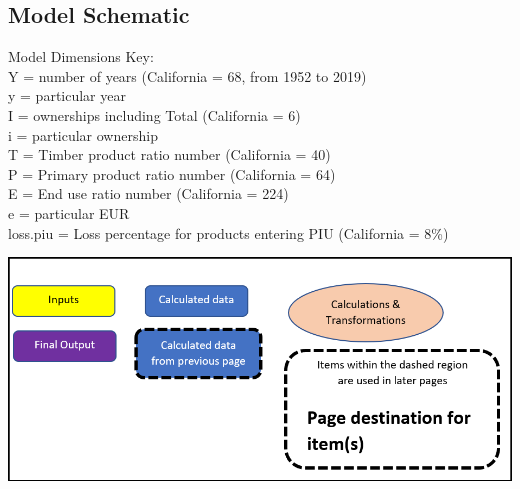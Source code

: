 \documentclass[
  openany]{book}
\begin{document}
\newpage

\hypertarget{model-func-schem}{%
\subsection{Model Schematic}\label{model-func-schem}}

Model Dimensions Key:\\
Y = number of years (California = 68, from 1952 to 2019)\\
y = particular year\\
I = ownerships including Total (California = 6)\\
i = particular ownership\\
T = Timber product ratio number (California = 40)\\
P = Primary product ratio number (California = 64)\\
E = End use ratio number (California = 224)\\
e = particular EUR\\
loss.piu = Loss percentage for products entering PIU (California = 8\%)

\includegraphics[width=1\linewidth]{images/schematic-0}

\newpage
\end{document}

